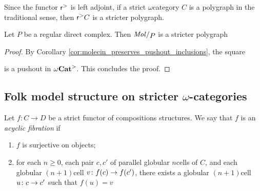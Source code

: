 \begin{rmk} \label{rmk:reflection_of_polygraph_is_stricter_polygraph}
    Since the functor \( \mathsf{r}^{>} \) is left adjoint, if a strict \( \omega \)\nbd category \( C \) is a polygraph in the traditional sense, then \( \mathsf{r}^{>} C \) is a stricter polygraph.
\end{rmk}

\begin{lem} \label{lem:stricter_regular_complex_are_stricter_polygraph}
    Let \( P \) be a regular direct complex.
    Then \( \molecin{P} \) is a stricter polygraph
\end{lem}
\begin{proof}
    By Corollary \ref{cor:molecin_preserves_pushout_inclusions}, the square
    \begin{center}
    \end{center}
    is a pushout in \( {\omega\mathbf{Cat}}^> \).
    This concludes the proof.
\end{proof}

\subsection{Folk model structure on stricter \texorpdfstring{$\omega$}{}-categories}

\begin{dfn}  \label{dfn:acyclic_fibration}
    Let \( f \colon C \to D \) be a strict functor of compositions structures.
    We say that \( f \) is an \emph{acyclic fibration} if
    \begin{enumerate}
        \item \( f \) is surjective on objects;
        \item for each \( n \geq 0 \), each pair \( c, c' \) of parallel globular \( n \)\nbd cells of \( C \), and each globular \( (n + 1) \)\nbd cell \( v \colon f(c) \to f(c') \), there exists a globular \( (n + 1) \)\nbd cell \( u \colon c \to c' \) such that \( f(u) = v \)
    \end{enumerate}
\end{dfn}


